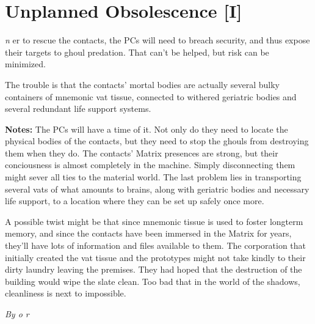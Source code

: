 \documentclass[letterpaper,twocolumn,10.5pt]{article}
\newenvironment{scenario}[6]
	{
		\section{#1 {\small[#2]}}
		\textit{#3}
		\def\TMPSCENARIO{#4 #5}
	}
	{\small\textit{By \TMPSCENARIO}}
\newcommand{\notes}{\textbf{Notes: }}
\begin{document}
\begin{scenario}{Unplanned Obsolescence}
In order to rescue the contacts, the PCs will need to breach security, and thus expose their targets to ghoul predation. That can't be helped, but risk can be minimized.

The trouble is that the contacts' mortal bodies are actually several bulky containers of mnemonic vat tissue, connected to withered geriatric bodies and several redundant life support systems.

\notes The PCs will have a time of it. Not only do they need to locate the physical bodies of the contacts, but they need to stop the ghouls from destroying them when they do. The contacts' Matrix presences are strong, but their conciousness is almost completely in the machine. Simply disconnecting them might sever all ties to the material world. The last problem lies in transporting several vats of what amounts to brains, along with geriatric bodies and necessary life support, to a location where they can be set up safely once more.

A possible twist might be that since mnemonic tissue is used to foster longterm memory, and since the contacts have been immersed in the Matrix for years, they'll have lots of information and files available to them. The corporation that initially created the vat tissue and the prototypes might not take kindly to their dirty laundry leaving the premises. They had hoped that the destruction of the building would wipe the slate clean. Too bad that in the world of the shadows, cleanliness is next to impossible. 

\end{scenario}
\end{document}
